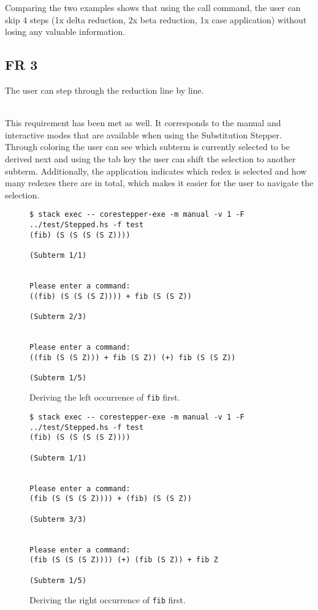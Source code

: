 Comparing the two examples shows that using the call command,
the user can skip 4 steps (1x delta reduction, 2x beta reduction, 1x case application)
without losing any valuable information.

\newpage
\subsection{FR 3}
The user can step through the reduction line by line.

\ \\
This requirement has been met as well.
It corresponds to the manual and interactive modes that are available when using the Substitution Stepper.
Through coloring the user can see which subterm is currently selected to be derived next and using the tab key the user can shift the selection to another subterm.
Additionally, the application indicates which redex is selected and how many redexes there are in total,
which makes it easier for the user to navigate the selection.

\begin{figure}[!ht]
\begin{verbatim}
$ stack exec -- corestepper-exe -m manual -v 1 -F ../test/Stepped.hs -f test
(fib) (S (S (S (S Z))))

(Subterm 1/1)


Please enter a command:
((fib) (S (S (S Z)))) + fib (S (S Z))

(Subterm 2/3)


Please enter a command:
((fib (S (S Z))) + fib (S Z)) (+) fib (S (S Z))

(Subterm 1/5)
\end{verbatim}
    \caption{Deriving the left occurrence of \texttt{fib} first.}
    \label{fig:FR3example1}
\end{figure}

\begin{figure}[!ht]
\begin{verbatim}
$ stack exec -- corestepper-exe -m manual -v 1 -F ../test/Stepped.hs -f test
(fib) (S (S (S (S Z))))

(Subterm 1/1)


Please enter a command:
(fib (S (S (S Z)))) + (fib) (S (S Z))

(Subterm 3/3)


Please enter a command:
(fib (S (S (S Z)))) (+) (fib (S Z)) + fib Z

(Subterm 1/5)
\end{verbatim}
    \caption{Deriving the right occurrence of \texttt{fib} first.}
    \label{fig:FR3example2}
\end{figure}

